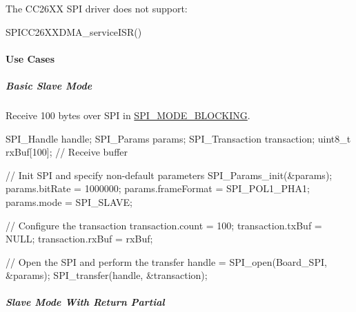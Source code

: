 The C\+C26\+X\+X S\+P\+I driver does not support\+:
\begin{DoxyItemize}
\item S\+P\+I\+C\+C26\+X\+X\+D\+M\+A\+\_\+service\+I\+S\+R()
\end{DoxyItemize}

\paragraph*{Use Cases\label{_s_p_i_c_c26_x_x_d_m_a_8h_USE_CASES_SPI}%
\hypertarget{_s_p_i_c_c26_x_x_d_m_a_8h_USE_CASES_SPI}{}%
}

\subparagraph*{Basic Slave Mode}

Receive 100 bytes over S\+P\+I in \hyperlink{_s_p_i_8h_ab9ea76c6529d6076eee5e1c4a5a92c6fa0dfb2358e008316426895e7237c398e8}{S\+P\+I\+\_\+\+M\+O\+D\+E\+\_\+\+B\+L\+O\+C\+K\+I\+N\+G}. 
\begin{DoxyCode}
SPI_Handle handle;
SPI_Params params;
SPI_Transaction transaction;
uint8\_t rxBuf[100];     \textcolor{comment}{// Receive buffer}

\textcolor{comment}{// Init SPI and specify non-default parameters}
SPI_Params_init(&params);
params.bitRate     = 1000000;
params.frameFormat = SPI_POL1_PHA1;
params.mode        = SPI_SLAVE;

\textcolor{comment}{// Configure the transaction}
transaction.count = 100;
transaction.txBuf = NULL;
transaction.rxBuf = rxBuf;

\textcolor{comment}{// Open the SPI and perform the transfer}
handle = SPI_open(Board\_SPI, &params);
SPI_transfer(handle, &transaction);
\end{DoxyCode}


\subparagraph*{Slave Mode With Return Partial\label{_s_p_i_c_c26_x_x_d_m_a_8h_USE_CASE_RP}%
\hypertarget{_s_p_i_c_c26_x_x_d_m_a_8h_USE_CASE_RP}{}%
}

